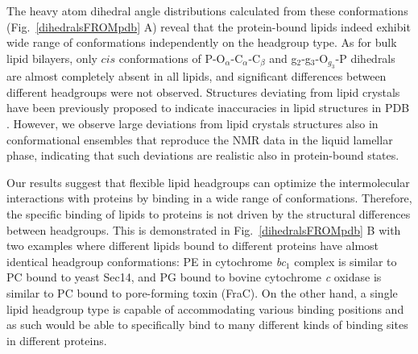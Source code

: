 \documentclass[aps,prl,superscriptaddress,twocolumn]{revtex4}
\begin{document}
The heavy atom dihedral angle distributions calculated from these conformations 
(Fig.~\ref{dihedralsFROMpdb} A) reveal that the protein-bound lipids indeed exhibit wide
range of conformations independently on the headgroup type.
As for bulk lipid bilayers, only $cis$ conformations
of P-O$_\alpha$-C$_\alpha$-C$_\beta$ and g$_2$-g$_3$-O$_{g_3}$-P dihedrals are almost
completely absent in all lipids, and significant differences between
different headgroups were not observed.
Structures deviating from lipid crystals 
have been previously proposed to indicate inaccuracies in lipid structures in PDB \cite{marsh13b,pezeshkian18}. 
However, we observe large deviations from lipid crystals structures also in conformational ensembles
that reproduce the NMR data in the liquid lamellar phase, indicating that such deviations
are realistic also in protein-bound states.

Our results suggest that flexible lipid headgroups can optimize the intermolecular interactions with proteins by binding
in a wide range of conformations.
Therefore, the specific binding of lipids to proteins is not driven by the structural differences between headgroups.
This is demonstrated in Fig.~\ref{dihedralsFROMpdb} B with two examples where different lipids bound to
different proteins have almost identical headgroup conformations:
PE in cytochrome {\it bc}$_1$ complex is similar to PC bound to yeast Sec14,
and PG bound to bovine cytochrome {\it c} oxidase is similar to PC bound to pore-forming toxin (FraC).
On the other hand, a single lipid headgroup type is capable of accommodating various binding positions and as such would 
be able to specifically bind to many different kinds of binding sites in different proteins.
\end{document}
